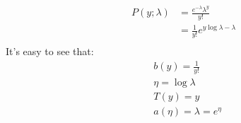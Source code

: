 \begin{answer}
\begin{align*}
    P(y;\lambda) &= \frac{e^{-\lambda}\lambda^y}{y!}\\
    &= \frac{1}{y!}e^{y \log\lambda-\lambda}\\
\end{align*}
It's easy to see that:
\begin{align*}
    &b(y) = \frac{1}{y!}\\
    &\eta = \log\lambda\\
    &T(y) = y\\
    &a(\eta) = \lambda = e^\eta\\
\end{align*}
\end{answer}
